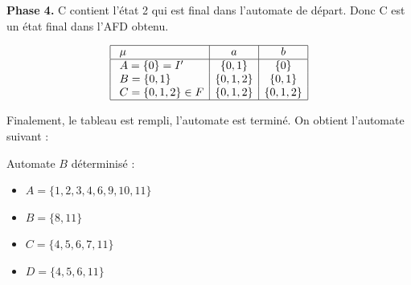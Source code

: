 \begin{corrections}
\begin{questions}
    \textbf{Phase 4.}
    C contient l'état 2 qui est final dans l'automate de départ. Donc C est un état final dans l'AFD obtenu.

    $$\begin{array}{| l | c | c|}
      \hline
      \  \mu & a & b \\
      \hline
      \  A = \{0\} = I' & \{0,1\} & \{0\} \\
      \  B = \{0,1\} &  \{0,1,2 \} & \{0,1\}  \\
      \  C = \{0,1,2\} \in F &  \{0,1,2 \} &  \{0,1,2 \} \\
      \hline
    \end{array}$$

    Finalement, le tableau est rempli, l'automate est terminé. On obtient l'automate suivant :

    \begin{center}
    \end{center}

  \item Automate $B$ déterminisé :\\
    \begin{minipage}[t]{.4\textwidth}
      \begin{itemize}
      \item $A = \{1, 2, 3, 4, 6, 9, 10, 11\}$
      \item $B = \{8, 11\}$
      \item $C = \{4, 5, 6, 7, 11\}$
      \item $D = \{4, 5, 6, 11\}$
      \end{itemize}
    \end{minipage}%
    \begin{minipage}[t]{.3\textwidth}
    \end{minipage}

  \end{questions}

\end{corrections}

